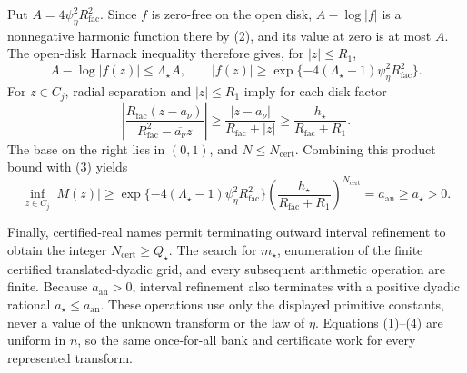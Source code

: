 Put \(A=4\psi_{\eta}^2R_{\mathrm{fac}}^2\).  Since \(f\) is zero-free on the open disk, \(A-\log|f|\) is a nonnegative harmonic function there by (2), and its value at zero is at most \(A\).  The open-disk Harnack inequality therefore gives, for \(|z|\le R_1\),
\[
 A-\log|f(z)|
 \le \Lambda_{\star}A,
 \qquad
 |f(z)|\ge
 \exp\{-4(\Lambda_{\star}-1)\psi_{\eta}^2R_{\mathrm{fac}}^2\}. \tag{3}
\]
For \(z\in C_j\), radial separation and \(|z|\le R_1\) imply for each disk factor
\[
 \left|
 \frac{R_{\mathrm{fac}}(z-a_\nu)}
      {R_{\mathrm{fac}}^2-\overline{a_\nu}z}
 \right|
 \ge \frac{|z-a_\nu|}{R_{\mathrm{fac}}+|z|}
 \ge \frac{h_{\star}}{R_{\mathrm{fac}}+R_1}.
\]
The base on the right lies in \((0,1)\), and \(N\le N_{\mathrm{cert}}\).  Combining this product bound with (3) yields
\[
 \inf_{z\in C_j}|M(z)|
 \ge
 \exp\{-4(\Lambda_{\star}-1)\psi_{\eta}^2R_{\mathrm{fac}}^2\}
 \left(\frac{h_{\star}}{R_{\mathrm{fac}}+R_1}\right)^{N_{\mathrm{cert}}}
 =a_{\mathrm{an}}
 \ge a_{\star}>0. \tag{4}
\]

Finally, certified-real names permit terminating outward interval refinement to obtain the integer \(N_{\mathrm{cert}}\ge Q_{\star}\).  The search for \(m_{\star}\), enumeration of the finite certified translated-dyadic grid, and every subsequent arithmetic operation are finite.  Because \(a_{\mathrm{an}}>0\), interval refinement also terminates with a positive dyadic rational \(a_{\star}\le a_{\mathrm{an}}\).  These operations use only the displayed primitive constants, never a value of the unknown transform or the law of \(\eta\).  Equations (1)--(4) are uniform in \(n\), so the same once-for-all bank and certificate work for every represented transform.